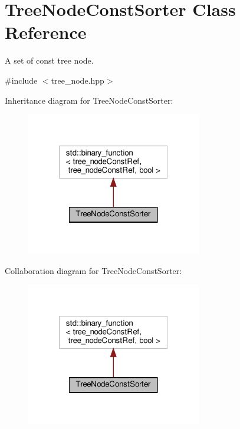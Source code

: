 \hypertarget{classTreeNodeConstSorter}{}\section{Tree\+Node\+Const\+Sorter Class Reference}
\label{classTreeNodeConstSorter}


A set of const tree node.  




{\ttfamily \#include $<$tree\+\_\+node.\+hpp$>$}



Inheritance diagram for Tree\+Node\+Const\+Sorter\+:
\nopagebreak
\begin{figure}[H]
\begin{center}
\leavevmode
\includegraphics[width=217pt]{da/d97/classTreeNodeConstSorter__inherit__graph}
\end{center}
\end{figure}


Collaboration diagram for Tree\+Node\+Const\+Sorter\+:
\nopagebreak
\begin{figure}[H]
\begin{center}
\leavevmode
\includegraphics[width=217pt]{d8/dc8/classTreeNodeConstSorter__coll__graph}
\end{center}
\end{figure}
